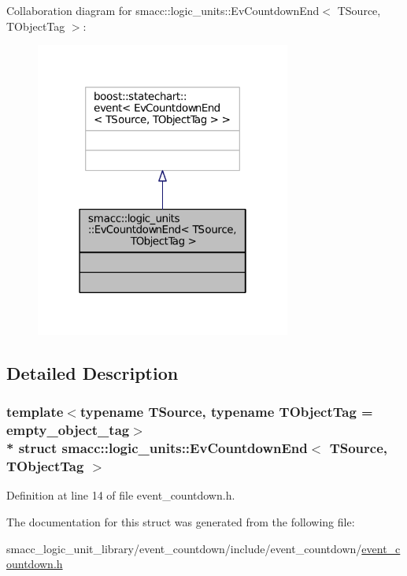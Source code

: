 Collaboration diagram for smacc\+:\+:logic\+\_\+units\+:\+:Ev\+Countdown\+End$<$ T\+Source, T\+Object\+Tag $>$\+:
\nopagebreak
\begin{figure}[H]
\begin{center}
\leavevmode
\includegraphics[width=238pt]{structsmacc_1_1logic__units_1_1EvCountdownEnd__coll__graph}
\end{center}
\end{figure}


\subsection{Detailed Description}
\subsubsection*{template$<$typename T\+Source, typename T\+Object\+Tag = empty\+\_\+object\+\_\+tag$>$\\*
struct smacc\+::logic\+\_\+units\+::\+Ev\+Countdown\+End$<$ T\+Source, T\+Object\+Tag $>$}



Definition at line 14 of file event\+\_\+countdown.\+h.



The documentation for this struct was generated from the following file\+:\begin{DoxyCompactItemize}
\item 
smacc\+\_\+logic\+\_\+unit\+\_\+library/event\+\_\+countdown/include/event\+\_\+countdown/\hyperlink{event__countdown_8h}{event\+\_\+countdown.\+h}\end{DoxyCompactItemize}
